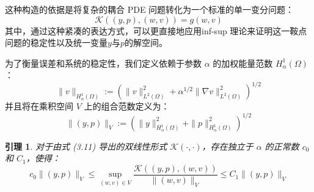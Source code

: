 \documentclass{xmu}
\theoremstyle{plain}
\newtheorem{lemma}[theorem]{引理}
\theoremstyle{remark}
\begin{document}
这种构造的依据是将复杂的耦合 PDE 问题转化为一个标准的单一变分问题：
\begin{equation}
  \mathcal{K}((y, p), (w, v)) = g(w, v)
\end{equation}
其中，通过这种紧凑的表达方式，可以更直接地应用inf-sup 理论来证明这一鞍点问题的稳定性以及统一变量$y$与$p$的解空间。

\label{subsec:weighted-norm}

为了衡量误差和系统的稳定性，我们定义依赖于参数 $\alpha$ 的加权能量范数 $H_\alpha^1(\Omega)$：
\begin{equation}
  \|v\|_{H_\alpha^1(\Omega)} := \left( \|v\|_{L^2(\Omega)}^2 + \alpha^{1/2}\|\nabla v\|_{L^2(\Omega)}^2 \right)^{1/2}
\end{equation}
并且将在乘积空间 $V$ 上的组合范数定义为：
\begin{equation}
  \|(y,p)\|_V := \left( \|y\|_{H_\alpha^1(\Omega)}^2 + \|p\|_{H_\alpha^1(\Omega)}^2 \right)^{1/2}
\end{equation}

\label{subsec:inf-sup-stability}

\begin{lemma}
  对于由式 (3.11) 导出的双线性形式 $\mathcal{K}(\cdot, \cdot)$，存在独立于 $\alpha$ 的正常数 $c_0$ 和 $C_1$，使得：
  \begin{equation}
  c_0 \|(y,p)\|_V \le \sup_{(w,v)\in V} \frac{\mathcal{K}((y,p),(w,v))}{\|(w,v)\|_V} \le C_1 \|(y,p)\|_V
  \end{equation}
\end{lemma}
\end{document}
